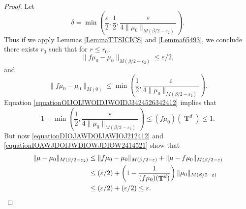 \documentclass[dvipsnames,letterpaper,12pt]{article}
\numberwithin{equation}{section}
\DeclareMathOperator{\TT}{\mathbf{T}}
\numberwithin{theorem}{section}
\begin{document}
\begin{proof}
    Let
    \[ \delta = \min \left( \frac{\varepsilon}{2}, \frac{1}{2}, \frac{\varepsilon}{4 \| \mu_0 \|_{M(\beta/2-\varepsilon_2)}} \right). \]
    Thus if we apply Lemmas \ref{LemmaTTSICICS} and \ref{Lemma65493}, we conclude there exists $r_0$ such that for $r \leq r_0$,
    \begin{equation} \label{equationDIOJAWDOIJAWIOJ212412}
        \| f \mu_0 - \mu_0 \|_{M(\beta/2 - \varepsilon_2)} \leq \varepsilon/2,
    \end{equation}
    and
    \begin{equation} \label{equationOIJOIJWOIDJWOIDJ3424526342412}
        \| f \mu_0 - \mu_0 \|_{M(0)} \leq \min \left( \frac{1}{2}, \frac{\varepsilon}{4 \| \mu_0 \|_{M(\beta/2 - \varepsilon_2)}} \right).
    \end{equation}
    Equation \eqref{equationOIJOIJWOIDJWOIDJ3424526342412} implies that
    \begin{equation} \label{equationIOAWJDOIJWDIOWJDIOW2414521}
        1 - \min \left( \frac{1}{2}, \frac{\varepsilon}{4 \| \mu_0 \|_{M(\beta/2 - \varepsilon_2)}} \right) \leq (f\mu_0)(\TT^d) \leq 1.
    \end{equation}
    But now \eqref{equationDIOJAWDOIJAWIOJ212412} and \eqref{equationIOAWJDOIJWDIOWJDIOW2414521} show that
    \begin{equation}
    \begin{split}
        \| \mu - \mu_0 \|_{M(\beta/2 - \varepsilon_2)} &\leq \| f \mu_0 - \mu_0 \|_{M(\beta/2 - \varepsilon)} + \| \mu - f \mu_0 \|_{M(\beta/2 - \varepsilon)}\\
        &\leq (\varepsilon/2) + \left( 1 - \frac{1}{(f \mu_0)(\TT^d)} \right) \| \mu_0 \|_{M(\beta/2 - \varepsilon)}\\
        &\leq (\varepsilon/2) + (\varepsilon/2) \leq \varepsilon. \qedhere
    \end{split}
    \end{equation}
\end{proof}
\end{document}
